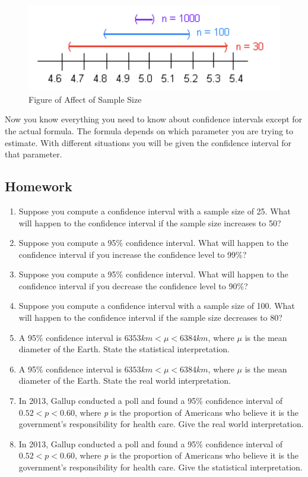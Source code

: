 \documentclass[
]{book}
\begin{document}
\begin{figure}
\centering
\includegraphics{effect_sample_size.png}
\caption{Figure of Affect of Sample Size}
\end{figure}

Now you know everything you need to know about confidence intervals except for the actual formula. The formula depends on which parameter you are trying to estimate. With different situations you will be given the confidence interval for that parameter.

\hypertarget{homework}{%
\subsection{Homework}\label{homework}}

\begin{enumerate}
\def\labelenumi{\arabic{enumi}.}
\item
  Suppose you compute a confidence interval with a sample size of 25. What will happen to the confidence interval if the sample size increases to 50?
\item
  Suppose you compute a 95\% confidence interval. What will happen to the confidence interval if you increase the confidence level to 99\%?
\item
  Suppose you compute a 95\% confidence interval. What will happen to the confidence interval if you decrease the confidence level to 90\%?
\item
  Suppose you compute a confidence interval with a sample size of 100. What will happen to the confidence interval if the sample size decreases to 80?
\item
  A 95\% confidence interval is \(6353km< \mu<6384km\), where \(\mu\) is the mean diameter of the Earth. State the statistical interpretation.
\item
  A 95\% confidence interval is \(6353 km < \mu < 6384 km\), where \(\mu\) is the mean diameter of the Earth. State the real world interpretation.
\item
  In 2013, Gallup conducted a poll and found a 95\% confidence interval of \(0.52 < p < 0.60\), where \emph{p} is the proportion of Americans who believe it is the government's responsibility for health care. Give the real world interpretation.
\item
  In 2013, Gallup conducted a poll and found a 95\% confidence interval of \(0.52 < p < 0.60\), where \emph{p} is the proportion of Americans who believe it is the government's responsibility for health care. Give the statistical interpretation.
\end{enumerate}
\end{document}
